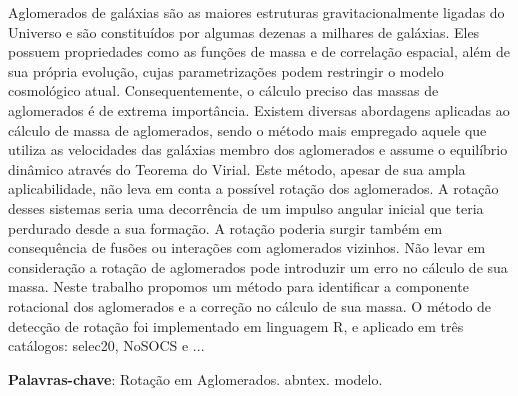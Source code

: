 %
%


\begin{center}
\imprimirtitulo
\end{center}

\begin{resumo}
Aglomerados de galáxias são as maiores estruturas gravitacionalmente ligadas do Universo e são constituídos por algumas dezenas a milhares de galáxias. Eles possuem propriedades como as funções de massa e de correlação espacial, além de sua própria evolução, cujas parametrizações podem restringir o modelo cosmológico atual.  Consequentemente, o cálculo preciso das massas de aglomerados é de extrema importância. Existem diversas abordagens aplicadas ao cálculo de massa de aglomerados, sendo o método mais empregado aquele que utiliza as velocidades das galáxias membro dos aglomerados e assume o equilíbrio dinâmico através do Teorema do Virial. 
Este método, apesar de sua ampla aplicabilidade, não leva em conta a possível rotação dos aglomerados. A rotação desses sistemas seria uma decorrência de um impulso angular inicial que teria perdurado desde a sua formação.  A rotação poderia surgir também  em consequência de fusões ou interações com aglomerados vizinhos. Não levar em consideração a rotação de aglomerados pode introduzir um erro no cálculo de sua massa. Neste trabalho propomos um método para identificar a componente rotacional dos aglomerados e a correção no cálculo de sua massa. O método de detecção de rotação foi implementado em linguagem R, e aplicado em três catálogos: selec20, NoSOCS e ...

\textbf{Palavras-chave}: Rotação em Aglomerados. abntex. modelo.

\end{resumo}
